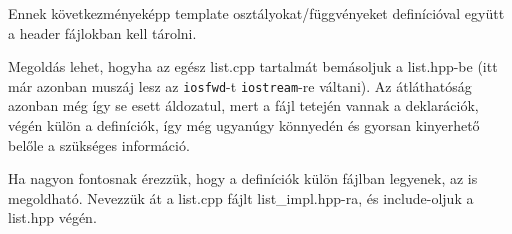 \documentclass[../cpp_book/cpp_book.tex]{subfiles}
\begin{document}
	Ennek következményeképp template osztályokat/függvényeket definícióval együtt a header fájlokban kell tárolni.
	
	Megoldás lehet, hogyha az egész list.cpp tartalmát bemásoljuk a list.hpp-be (itt már azonban muszáj lesz az \texttt{iosfwd}-t \texttt{iostream}-re váltani). Az átláthatóság azonban még így se esett áldozatul, mert a fájl tetején vannak a deklarációk, végén külön a definíciók, így még ugyanúgy könnyedén és gyorsan kinyerhető belőle a szükséges információ.
	
	\begin{note}
		Ha nagyon fontosnak érezzük, hogy a definíciók külön fájlban legyenek, az is megoldható. Nevezzük át a {list.cpp} fájlt {list\_impl.hpp}-ra, és include-oljuk a {list.hpp} végén.
	\end{note}
	
\end{document}
